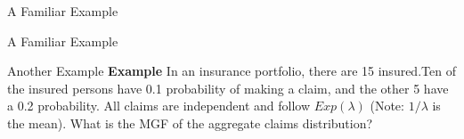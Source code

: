 \documentclass[11pt]{beamer}
\begin{document}
\begin{frame}{A Familiar Example}

\end{frame}
\begin{frame}{A Familiar Example}

\end{frame}
\begin{frame}{Another Example}
\vspace{- 3cm}  
  \textbf{Example} In an insurance portfolio, there are 15 insured.Ten of the insured persons have 0.1 probability of making a claim, and the other 5 have a 0.2 probability. All claims are independent and follow $Exp(\lambda)$ (Note: $1/\lambda$ is the mean). What is the MGF of the aggregate claims distribution?

\end{frame}
\begin{frame}

\end{frame}
\begin{frame}

\end{frame}
\end{document}
